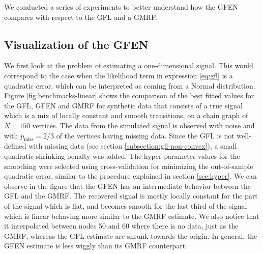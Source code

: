 \documentclass[a4paper, 11pt]{article}
\begin{document}
We conducted a series of experiments to better understand how the GFEN compares with respect to the GFL and a GMRF. 

\subsection{Visualization of the GFEN}

We first look at the problem of estimating a one-dimensional signal. This would correspond to the case when the likelihood term in expression \eqref{eq:gfl} is a quadratic error, which can be interpreted as coming from a Normal distribution. Figure \ref{fig:benchmarks-linear} shows the comparison of the best fitted values for the GFL, GFEN and GMRF for synthetic data that consists of a true signal which is a mix of locally constant and smooth transitions, on a chain graph of $N=150$ vertices. The data from the simulated signal is observed with noise and with $p_\text{miss}=2/3$ of the vertices having missing data. Since the GFL is not well-defined with missing data (see section \ref{subsection:gfl-non-convex}), a small quadratic shrinking penalty was added. The hyper-parameter values for the smoothing were selected using cross-validation for minimizing the out-of-sample quadratic error, similar to the procedure explained in section \ref{sec:hyper}. We can observe in the figure that the GFEN has an intermediate behavior between the GFL and the GMRF. The recovered signal is mostly locally constant for the part of the signal which is flat, and becomes smooth for the last third of the signal which is linear behaving more similar to the GMRF estimate. We also notice that it interpolated between nodes 50 and 60 where there is no data, just as the GMRF, whereas the GFL estimate are shrunk towards the origin. In general, the GFEN estimate is less wiggly than its GMRF counterpart.
\end{document}
